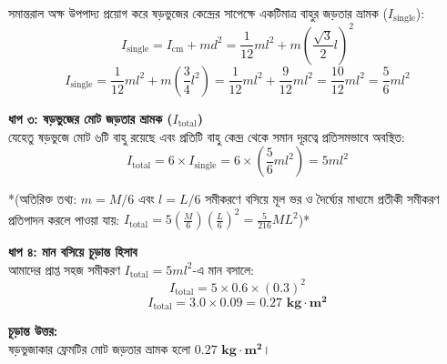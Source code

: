 \documentclass[12pt, a4paper]{article}
\begin{document}
\begin{tcolorbox}[solutionbox={সমাধান (Solution)}]
\begin{center}
\begin{tikzpicture}[>=Stealth, scale=1.2, text=black]
\end{tikzpicture}
\end{center}
\vspace{1em}

সমান্তরাল অক্ষ উপপাদ্য প্রয়োগ করে ষড়ভুজের কেন্দ্রের সাপেক্ষে একটিমাত্র বাহুর জড়তার ভ্রামক ($I_{\text{single}}$):
$$I_{\text{single}} = I_{\text{cm}} + m d^2 = \frac{1}{12} m l^2 + m \left(\frac{\sqrt{3}}{2} l\right)^2$$
$$I_{\text{single}} = \frac{1}{12} m l^2 + m \left(\frac{3}{4} l^2\right) = \frac{1}{12} m l^2 + \frac{9}{12} m l^2 = \frac{10}{12} m l^2 = \frac{5}{6} m l^2$$

\vspace{0.5em}
\noindent
\textbf{ধাপ ৩: ষড়ভুজের মোট জড়তার ভ্রামক ($I_{\text{total}}$)} \\
যেহেতু ষড়ভুজে মোট ৬টি বাহু রয়েছে এবং প্রতিটি বাহু কেন্দ্র থেকে সমান দূরত্বে প্রতিসমভাবে অবস্থিত:
$$I_{\text{total}} = 6 \times I_{\text{single}} = 6 \times \left(\frac{5}{6} m l^2\right) = 5 m l^2$$

*(অতিরিক্ত তথ্য: $m = M/6$ এবং $l = L/6$ সমীকরণে বসিয়ে মূল ভর ও দৈর্ঘ্যের মাধ্যমে প্রতীকী সমীকরণ প্রতিপাদন করলে পাওয়া যায়: $I_{\text{total}} = 5 \left(\frac{M}{6}\right) \left(\frac{L}{6}\right)^2 = \frac{5}{216} M L^2$)*

\vspace{0.5em}
\noindent
\textbf{ধাপ ৪: মান বসিয়ে চূড়ান্ত হিসাব} \\
আমাদের প্রাপ্ত সহজ সমীকরণ $I_{\text{total}} = 5 m l^2$-এ মান বসালে:
$$I_{\text{total}} = 5 \times 0.6 \times (0.3)^2$$
$$I_{\text{total}} = 3.0 \times 0.09 = \mathbf{0.27\text{ kg}\cdot\text{m}^2}$$

\vspace{1em}
\begin{tcolorbox}[answerbox]
\textbf{চূড়ান্ত উত্তর:} \\
ষড়ভুজাকার ফ্রেমটির মোট জড়তার ভ্রামক হলো $\mathbf{0.27\text{ kg}\cdot\text{m}^2}$।
\end{tcolorbox}
\end{tcolorbox}
\end{document}
